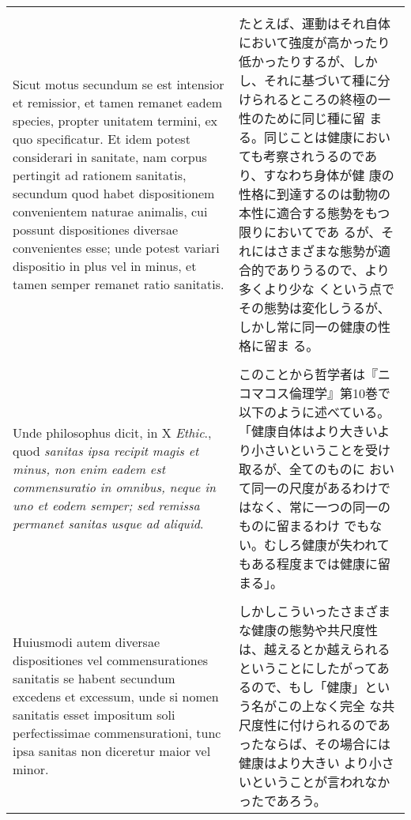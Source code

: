\documentclass[10pt]{jsarticle} %
\begin{document}
\begin{longtable}{p{21em}p{21em}}
\\\\


Sicut motus
secundum se est intensior et remissior, et tamen remanet eadem
species, propter unitatem termini, ex quo specificatur. Et idem potest
considerari in sanitate, nam corpus pertingit ad rationem sanitatis,
secundum quod habet dispositionem convenientem naturae animalis, cui
possunt dispositiones diversae convenientes esse; unde potest variari
dispositio in plus vel in minus, et tamen semper remanet ratio
sanitatis. 


&

たとえば、運動はそれ自体において強度が高かったり低かったりするが、しか
 し、それに基づいて種に分けられるところの終極の一性のために同じ種に留
 まる。同じことは健康においても考察されうるのであり、すなわち身体が健
 康の性格に到達するのは動物の本性に適合する態勢をもつ限りにおいてであ
 るが、それにはさまざまな態勢が適合的でありうるので、より多くより少な
 くという点でその態勢は変化しうるが、しかし常に同一の健康の性格に留ま
 る。

\\\\


Unde philosophus dicit, in X {\itshape Ethic}., quod {\itshape sanitas ipsa
recipit magis et minus, non enim eadem est commensuratio in omnibus,
neque in uno et eodem semper; sed remissa permanet sanitas usque ad
aliquid}. 


&

このことから哲学者は『ニコマコス倫理学』第10巻で以下のように述べている。
 「健康自体はより大きいより小さいということを受け取るが、全てのものに
 おいて同一の尺度があるわけではなく、常に一つの同一のものに留まるわけ
 でもない。むしろ健康が失われてもある程度までは健康に留まる」。

\\\\


Huiusmodi autem diversae dispositiones vel commensurationes
sanitatis se habent secundum excedens et excessum, unde si nomen
sanitatis esset impositum soli perfectissimae commensurationi, tunc
ipsa sanitas non diceretur maior vel minor. 


&

しかしこういったさまざまな健康の態勢や共尺度性は、越えるとか越えられる
 ということにしたがってあるので、もし「健康」という名がこの上なく完全
 な共尺度性に付けられるのであったならば、その場合には健康はより大きい
 より小さいということが言われなかったであろう。


\end{longtable}
\end{document}
